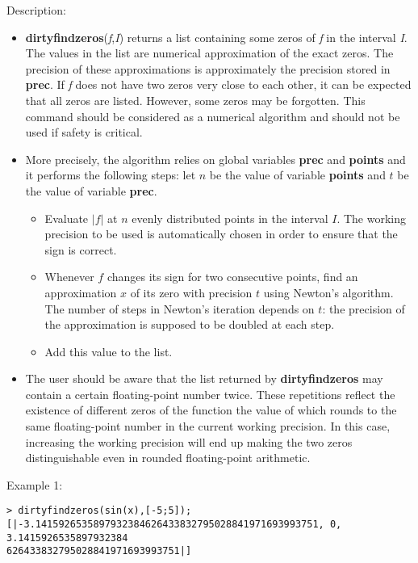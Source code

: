 \noindent Description: \begin{itemize}

\item \textbf{dirtyfindzeros}(\emph{f},\emph{I}) returns a list containing some zeros of \emph{f} in the
   interval \emph{I}. The values in the list are numerical approximation of the exact
   zeros. The precision of these approximations is approximately the precision
   stored in \textbf{prec}. If \emph{f} does not have two zeros very close to each other, it 
   can be expected that all zeros are listed. However, some zeros may be
   forgotten. This command should be considered as a numerical algorithm and
   should not be used if safety is critical.

\item More precisely, the algorithm relies on global variables \textbf{prec} and \textbf{points} and it performs the following steps: 
   let $n$ be the value of variable \textbf{points} and $t$ be the value
   of variable \textbf{prec}.
   \begin{itemize}
   \item Evaluate $|f|$ at $n$ evenly distributed points in the interval $I$.
     The working precision to be used is automatically chosen in order to ensure that the sign
     is correct.
   \item Whenever $f$ changes its sign for two consecutive points,
     find an approximation $x$ of its zero with precision $t$ using
     Newton's algorithm. The number of steps in Newton's iteration depends on $t$:
     the precision of the approximation is supposed to be doubled at each step.
   \item Add this value to the list.
   \end{itemize}

\item The user should be aware that the list returned by \textbf{dirtyfindzeros} may
   contain a certain floating-point number twice. These repetitions
   reflect the existence of different zeros of the function the value of
   which rounds to the same floating-point number in the current working
   precision. In this case, increasing the working precision will end up
   making the two zeros distinguishable even in rounded floating-point
   arithmetic.
\end{itemize}
\noindent Example 1: 
\begin{center}\begin{minipage}{15cm}\begin{Verbatim}[frame=single]
> dirtyfindzeros(sin(x),[-5;5]);
[|-3.1415926535897932384626433832795028841971693993751, 0, 3.1415926535897932384
626433832795028841971693993751|]
\end{Verbatim}
\end{minipage}\end{center}
